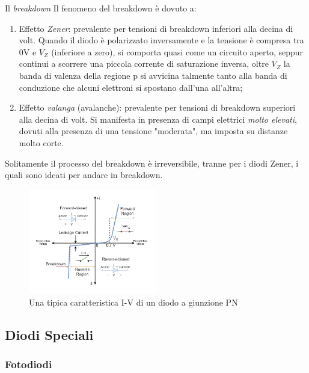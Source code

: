 \documentclass[
]{book}
\begin{document}
\begin{greenbox}{Il \emph{breakdown}}
Il fenomeno del breakdown è dovuto a:
\begin{enumerate}
\item Effetto \emph{Zener}: prevalente per tensioni di breakdown inferiori alla decina di volt. Quando il diodo è polarizzato
    inversamente e la tensione è compresa tra $0\si{\volt}$ e $V_Z$ (inferiore a zero), si comporta quasi come un circuito aperto,
    seppur continui a scorrere una piccola corrente di saturazione inversa, oltre $V_Z$ la banda di valenza della regione p si
    avvicina talmente tanto alla banda di conduzione che alcuni elettroni si spostano dall'una all'altra;
\item Effetto \emph{valanga} (avalanche): prevalente per tensioni di breakdown superiori alla decina di volt. Si manifesta
    in presenza di campi elettrici \emph{molto elevati}, dovuti alla presenza di una tensione "moderata", ma imposta su distanze
    molto corte.
\end{enumerate}

Solitamente il processo del breakdown è irreversibile, tranne per i diodi Zener, i quali sono ideati per andare in breakdown.
\end{greenbox}
\begin{figure}[H]
    \centering
    \includegraphics[width=0.5\textwidth]{immagini/iv_pn.png} %
    \caption{Una tipica caratteristica I-V di un diodo a giunzione PN}
    \label{fig:caratteristica_pn}
\end{figure}

\subsection{Diodi Speciali}\label{diodi-speciali}

\subsubsection{Fotodiodi}\label{fotodiodi}
\end{document}
